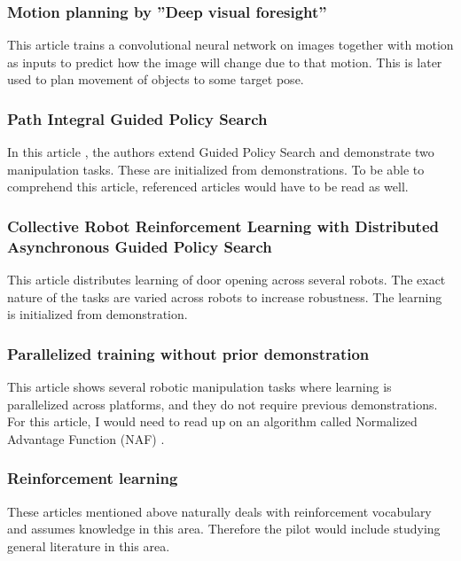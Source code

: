 \subsubsection{Motion planning by ''Deep visual foresight''}

This article \cite{finn2016deep} trains a convolutional neural network on
images together with motion as inputs to predict how the image will change due
to that motion. This is later used to plan movement of objects to some target
pose.

\subsubsection{Path Integral Guided Policy Search}

In this article \cite{chebotar2016path}, the authors extend Guided Policy
Search and demonstrate two manipulation tasks. These are initialized from
demonstrations. To be able to comprehend this article, referenced articles
\cite{levine2016end,theodorou2010generalized,montgomery2016guided} would have
to be read as well.

\subsubsection{Collective Robot Reinforcement Learning with Distributed
               Asynchronous Guided Policy Search}

This article \cite{yahya2016collective} distributes learning of
door opening across several robots. The exact nature of the tasks
are varied across robots to increase robustness. The learning is
initialized from demonstration.

\subsubsection{Parallelized training without prior demonstration}

This article \cite{gu2016deep} shows several robotic manipulation tasks where
learning is parallelized across platforms, and they do not require previous
demonstrations.  For this article, I would need to read up on an algorithm
called Normalized Advantage Function (NAF) \cite{gu2016continuous}.


\subsubsection{Reinforcement learning}
These articles mentioned above naturally deals with reinforcement vocabulary and
assumes knowledge in this area. Therefore the pilot would include studying
general literature in this area.


